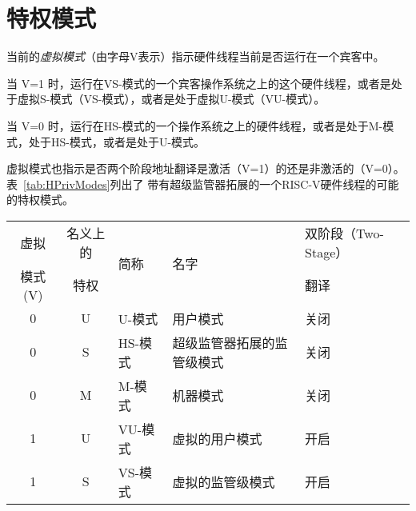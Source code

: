 \section{特权模式}

当前的{\em 虚拟模式}（由字母V表示）指示硬件线程当前是否运行在一个宾客中。

当 V=1 时，运行在VS-模式的一个宾客操作系统之上的这个硬件线程，或者是处于虚拟S-模式（VS-模式），或者是处于虚拟U-模式（VU-模式）。

当 V=0 时，运行在HS-模式的一个操作系统之上的硬件线程，或者是处于M-模式，处于HS-模式，或者是处于U-模式。

虚拟模式也指示是否两个阶段地址翻译是激活（V=1）的还是非激活的（V=0）。表~\ref{tab:HPrivModes}列出了
带有超级监管器拓展的一个RISC-V硬件线程的可能的特权模式。

\begin{table*}[h!]
\begin{center}
\begin{tabular}{|c|c||l|l|l|}
  \hline
   虚拟           & 名义上的   & \multirow{2}{*}{简称} & \multirow{2}{*}{名字} & 双阶段（Two-Stage） \\
   模式 (V)       & 特权 &                               &                       & 翻译 \\ \hline
   0              & U         & U-模式  & 用户模式 & 关闭 \\
   0              & S         & HS-模式 & 超级监管器拓展的监管级模式 & 关闭 \\
   0              & M         & M-模式  & 机器模式 & 关闭 \\
  \hline
   1              & U         & VU-模式 & 虚拟的用户模式 & 开启 \\
   1              & S         & VS-模式 & 虚拟的监管级模式 & 开启 \\
  \hline
 \end{tabular}
\end{center}
\caption{带有超级监管级拓展的特权模式。 Privilege modes with the hypervisor extension.}
\label{tab:HPrivModes}
\end{table*}

